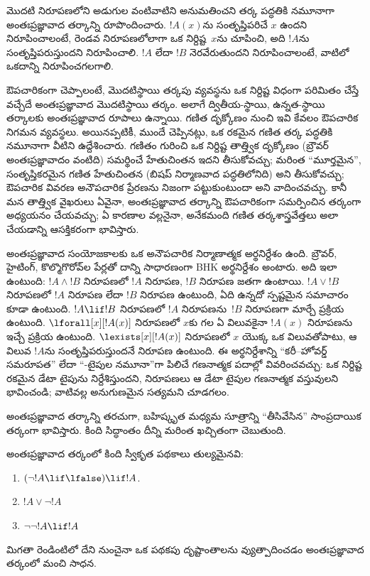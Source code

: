 \documentclass[../../../include/open-logic-section]{subfiles}
\begin{document}
మొదటి నిరూపణలోని అడుగుల వంటివాటిని అనుమతించని తర్క పద్ధతికి
నమూనాగా అంతఃప్రజ్ఞావాద తర్కాన్ని రూపొందించారు. $!A(x)$ను
సంతృప్తిపరిచే $x$ ఉందని నిరూపించాలంటే, రెండవ నిరూపణలోలాగా ఒక
నిర్దిష్ట~$x$ను చూపించి, అది $!A$ను సంతృప్తిపరుస్తుందని నిరూపించాలి.
$!A$ లేదా $!B$ నెరవేరుతుందని నిరూపించాలంటే, వాటిలో ఒకదాన్ని
నిరూపించగలగాలి.

ఔపచారికంగా చెప్పాలంటే, మొదటిస్థాయి తర్కపు  వ్యవస్థను
ఒక నిర్దిష్ట విధంగా పరిమితం చేస్తే వచ్చేదే అంతఃప్రజ్ఞావాద
మొదటిస్థాయి తర్కం. అలాగే ద్వితీయ-స్థాయి, ఉన్నత-స్థాయి తర్కాలకు
అంతఃప్రజ్ఞావాద రూపాలు ఉన్నాయి. గణిత దృక్కోణం నుంచి ఇవి కేవలం
ఔపచారిక నిగమన వ్యవస్థలు. అయినప్పటికీ, ముందే చెప్పినట్లు, ఒక రకమైన గణిత
తర్క పద్ధతికి నమూనాగా వీటిని ఉద్దేశించారు. గణితం గురించి ఒక
నిర్దిష్ట తాత్త్విక దృక్కోణం (బ్రౌవర్ అంతఃప్రజ్ఞావాదం వంటిది)
సమర్థించే హేతుచింతన ఇదని తీసుకోవచ్చు; మరింత ``మూర్తమైన'', సంతృప్తికరమైన
గణిత హేతుచింతన (బిషప్ నిర్మాణవాద పద్ధతిలోనిది) అని తీసుకోవచ్చు;
ఔపచారిక వివరణ అనౌపచారిక ప్రేరణను నిజంగా పట్టుకుంటుందా అని వాదించవచ్చు.
కానీ మన తాత్త్విక వైఖరులు ఏవైనా, అంతఃప్రజ్ఞావాద తర్కాన్ని ఔపచారికంగా
సమర్పించిన తర్కంగా అధ్యయనం చేయవచ్చు; ఏ కారణాల వల్లనైనా, అనేకమంది
గణిత తర్కశాస్త్రవేత్తలు అలా చేయడాన్ని ఆసక్తికరంగా భావిస్తారు.

అంతఃప్రజ్ఞావాద సంయోజకాలకు ఒక అనౌపచారిక నిర్మాణాత్మక అర్థనిర్దేశం
ఉంది. బ్రౌవర్, హైటింగ్, కొల్మొగొరోవ్‌ల పేర్లతో దాన్ని సాధారణంగా BHK
అర్థనిర్దేశం అంటారు. అది ఇలా ఉంటుంది: $!A \land !B$ నిరూపణలో $!A$
నిరూపణ, $!B$ నిరూపణ జతగా ఉంటాయి. $!A \lor !B$ నిరూపణలో $!A$
నిరూపణ లేదా $!B$ నిరూపణ ఉంటుంది, ఏది ఉన్నదో స్పష్టమైన సమాచారం కూడా
ఉంటుంది. $!A \lif !B$ నిరూపణలో $!A$ నిరూపణను~$!B$ నిరూపణగా మార్చే
ప్రక్రియ ఉంటుంది. $\lforall[x][!A(x)]$ నిరూపణలో $x$కు గల ఏ
విలువకైనా $!A(x)$ నిరూపణను ఇచ్చే ప్రక్రియ ఉంటుంది.
$\lexists[x][!A(x)]$ నిరూపణలో $x$ యొక్క ఒక విలువతోపాటు, ఆ విలువ
$!A$ను సంతృప్తిపరుస్తుందనే నిరూపణ ఉంటుంది. ఈ అర్థనిర్దేశాన్ని
``కరీ--హోవర్డ్ సమరూపత'' లేదా ``-టైపుల నమూనా''గా పిలిచే
గణనాత్మక పదాల్లో వివరించవచ్చు:  ఒక నిర్దిష్ట రకమైన డేటా
టైపును నిర్దేశిస్తుందని, నిరూపణలు ఆ డేటా టైపుల గణనాత్మక వస్తువులని
భావించండి; వాటివల్ల అనుగుణమైన  సత్యమని చూడగలం.

అంతఃప్రజ్ఞావాద తర్కాన్ని తరచుగా, బహిష్కృత మధ్యమ సూత్రాన్ని
``తీసివేసిన'' సాంప్రదాయిక తర్కంగా భావిస్తారు. కింది సిద్ధాంతం దీన్ని
మరింత ఖచ్చితంగా చెబుతుంది.
\begin{thm}
అంతఃప్రజ్ఞావాద తర్కంలో కింది స్వీకృత పథకాలు తుల్యమైనవి:
\begin{enumerate}
\item $(\lnot !A \lif \lfalse) \lif !A$.
\item $!A \lor \lnot !A$
\item $\lnot \lnot !A \lif !A$
\end{enumerate}
\end{thm}
మిగతా రెండింటిలో దేని నుంచైనా ఒక పథకపు దృష్టాంతాలను వ్యుత్పాదించడం
అంతఃప్రజ్ఞావాద తర్కంలో మంచి సాధన.
\end{document}
